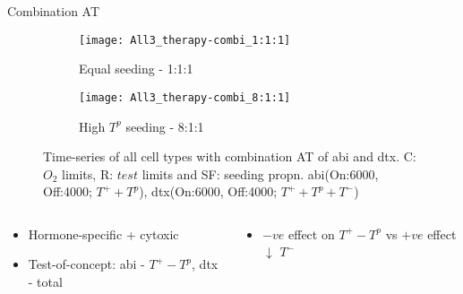 \begin{frame}{Combination AT}
  \begin{figure}[h]
    \centering
    \begin{subfigure}[b]{0.48\textwidth}
      \centering
      \texttt{[image: All3\_therapy-combi\_1:1:1]}
      \caption{Equal seeding - 1:1:1}
    \end{subfigure}
    \begin{subfigure}[b]{0.48\textwidth}
      \centering
      \texttt{[image: All3\_therapy-combi\_8:1:1]}
      \caption{High $T^p$ seeding - 8:1:1}
    \end{subfigure}
    \caption{Time-series of all cell types with combination AT of abi and dtx. C: $O_2$ limits, R: $test$ limits and SF: seeding propn. abi(On:6000, Off:4000; $T^+ + T^p$), dtx(On:6000, Off:4000; $T^+ + T^p + T^-$)}
  \end{figure}
  \begin{columns}
    \begin{column}{0.5\textwidth}
      \begin{itemize}
        \item Hormone-specific + cytoxic \cite{West}
        \item Test-of-concept: abi - $T^+ - T^p$, dtx - total
      \end{itemize}
    \end{column}
    \begin{column}{0.5\textwidth}
      \begin{itemize}
        \item $-ve$ effect on $T^+ - T^p$ vs $+ve$ effect $\downarrow$ $T^-$
      \end{itemize}
    \end{column}
  \end{columns}
\end{frame}
